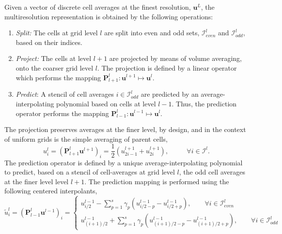 \documentclass[12pt,letterpaper]{article}
\begin{document}
        Given a vector of discrete cell averages at the finest resolution,
        $\bm{u}^{L}$, the multiresolution representation is obtained by the
        following operations:
        \begin{enumerate}
            \item[] \textit{Split:} The cells at grid level $l$ are split into
                even and odd sets, $\bm{\mathcal{I}}_{even}^{l}$ and
                $\bm{\mathcal{I}}_{odd}^{l}$, based on their indices.
            \item[] \textit{Project:} The cells at level $l+1$ are projected
                by means of volume averaging, onto the coarser grid
                level $l$. The projection is defined by a linear operator
                which performs the mapping $\bm{P}_{l+1}^{l} : \bm{u}^{l+1}
                \mapsto \bm{u}^{l}$. 
            \item[] \textit{Predict}: A stencil of cell averages $i \in
                \bm{\mathcal{I}}_{odd}^{l}$ are predicted by an
                average-interpolating polynomial based on cells at level $l-1$.
                Thus, the prediction operator performs the mapping
                $\bm{P}_{l-1}^{l} : \bm{u}^{l-1} \mapsto \bm{u}^{l}$. 
        \end{enumerate}
        The projection preserves averages at the finer level, by design, and in
        the context of uniform grids is the simple averaging of parent cells,
        \begin{equation}
            u^{l}_{i} = \left( \bm{P}_{l+1}^{l} \bm{u}^{l+1} \right)_{i} = \frac{1}{2} ( u^{l+1}_{2i-1} + u^{l+1}_{2i} ), \text{ }
            \text{ } \text{ } \text{ } \forall i \in \bm{\mathcal{I}}^{l}.
        \end{equation}
        The prediction operator is defined by a unique average-interpolating
        polynomial to predict, based on a stencil of cell-averages at grid level
        $l$, the odd cell averages at the finer level level $l+1$. The
        prediction mapping is performed using the following centered
        interpolants,
        \begin{equation}
            \tilde{u}_{i}^{l} = \left( \bm{P}_{l-1}^{l} \bm{u}^{l-1}
            \right)_{i} = 
            \begin{cases}
                u_{i/2}^{l-1} - \sum_{p=1}^{s} \gamma_{p} \left( u^{l-1}_{i/2-p} -
                u^{l-1}_{i/2+p} \right), \text{ } \text{ } \text{ } \forall
                i \in \bm{\mathcal{I}}_{even}^{l} \\
                u_{(i+1)/2}^{l-1} + \sum_{p=1}^{s} \gamma_{p} \left(
                u^{l-1}_{(i+1)/2-p} - u^{l-1}_{(i+1)/2+p} \right), \text{ }
                \text{ } \text{ } \forall i \in \bm{\mathcal{I}}_{odd}^{l}
            \end{cases}
        \end{equation}
\end{document}
